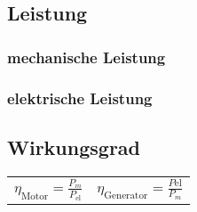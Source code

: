 {\subsection{Leistung}
\subsubsection{mechanische Leistung}

\subsubsection{elektrische Leistung}

\subsection{Wirkungsgrad}
\begin{tabularx}{\columnwidth}{>{\centering\arraybackslash}X >{\centering\arraybackslash}X}
$\eta_\text{Motor} = \frac{P_m}{P_\text{el}}$ & $\eta_\text{Generator} = \frac{P\text{el}}{P_m}$
\end{tabularx}
}
